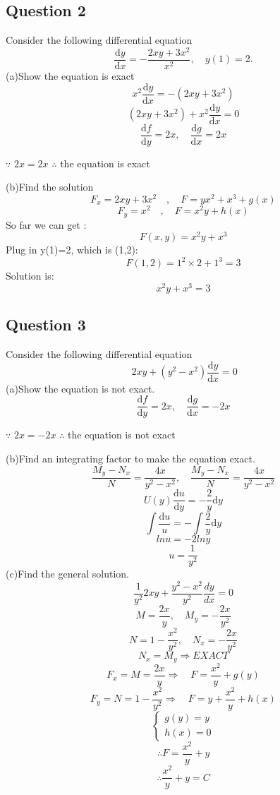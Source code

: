\documentclass[12pt]{article}
\begin{document}
\pagebreak
\subsection*{Question 2}
Consider the following differential equation\\
\[
\frac{\text{d}y}{\text{d}x}=-\frac{2xy+3x^2}{x^2}  , \quad y(1)=2.
\] 
(a)Show the equation is exact
\[
x^2\frac{\text{d}y}{\text{d}x}=-(2xy+3x^{2}) \]
\[
(2xy+3x^{2})+x^2\frac{\text{d}y}{\text{d}x}=0
\]
\[
\dfrac{\text{d}f}{\text{d}y}=2x, \quad \dfrac{\text{d}g}{\text{d}x}=2x
\]
\begin{center}
	$\because $ $2x=2x$    $\therefore$ the equation is exact
\end{center} 

(b)Find the solution
\[
F_{x}=2xy+3x^{2} \quad , \quad F=yx^{2} + x^{3} + g(x)
\]
\[
F_{y}=x^{2} \quad , \quad F=x^2y+h(x)
\]
So far we can get :
\[
F(x,y)=x^2y+x^3
\]
Plug in y(1)=2, which is (1,2):\\
\[
F(1,2)=1^2\times2 +1^3 = 3
\]
Solution is: \\
\[
x^2y+x^3=3
\]
\pagebreak


\subsection*{Question 3}
Consider the following differential equation\\
\[
\ 2xy+(y^2-x^2)\frac{\text{d}y}{\text{d}x}=0
\] 
(a)Show the equation is not exact.
\[
\dfrac{\text{d}f}{\text{d}y}=2x, \quad \dfrac{\text{d}g}{\text{d}x}=-2x
\]
\begin{center}
	$\because $ $2x=-2x$    $\therefore$ the equation is not exact
\end{center} 

(b)Find an integrating factor to make the equation exact.
\[
\frac{M_{y}-N_{x}}{N}=\frac{4x}{y^2-x^2} , \quad \frac{M_{y}-N_{x}}{N}=\frac{4x}{y^2-x^2}
\]
\[U(y)  \frac{\text{d}u}{\text{d}y} = -\frac{2}{y}\text{d}y
\]
\[
\int\frac{\text{d}u}{u}=-\int \frac{2}{y}{\text{d}y} 
\]
\[
lnu=-2lny
\]
\[
u=\frac{1}{y^2}
\]
(c)Find the general solution.
\[\frac{1}{y^2}2xy+\frac{y^2-x^2}{y^2}\frac{dy}{dx}=0 \]
\[M=\frac{2x}{y} , \quad M_{y}=-\frac{2x}{y^2}\]
\[N=1-\frac{x^2}{y^2} , \quad N_{x}=-\frac{2x}{y^2}\]
\[N_{x}=M_{y}\Rightarrow EXACT\]
\[F_{x}=M=\frac{2x}{y} \Rightarrow \quad F= \frac{x^2}{y}+g(y)\]
\[F_{y}=N=1-\frac{x^2}{y^2} \Rightarrow \quad F= y+\frac{x^2}{y}+h(x)\]
\[\begin{cases}g(y) = y\\ h(x) = 0\end{cases}\]
\[\therefore F=\frac{x^2}{y}+y\]
\[\therefore \frac{x^2}{y}+y=C\]
\pagebreak
\end{document}
